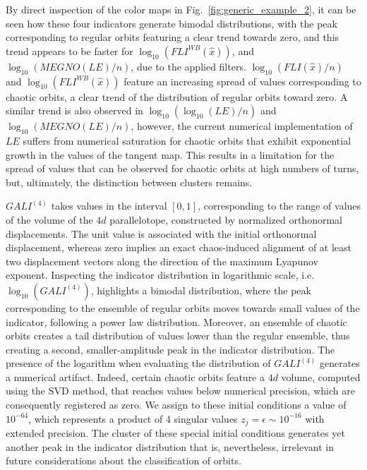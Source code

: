 \begin{chapterappendices}
By direct inspection of the color maps in Fig.~\ref{fig:generic_example_2}, it can be seen how these four indicators generate bimodal distributions, with the peak corresponding to regular orbits featuring a clear trend towards zero, and this trend appears to be faster for $\log_{10}(FLI^{WB}(\hat{x}))$, and $\log_{10}(MEGNO(LE)/n)$, due to the applied filters. $\log_{10}(FLI(\hat{x})/n)$ and $\log_{10}(FLI^{WB}(\hat{x}))$ feature an increasing spread of values corresponding to chaotic orbits, a clear trend of the distribution of regular orbits toward zero. A similar trend is also observed in $\log_{10}(\log_{10}(LE)/n)$ and $\log_{10}(MEGNO(LE)/n)$, however, the current numerical implementation of $LE$ suffers from numerical saturation for chaotic orbits that exhibit exponential growth in the values of the tangent map. This results in a limitation for the spread of values that can be observed for chaotic orbits at high numbers of turns, but, ultimately, the distinction between clusters remains. 

$GALI^{(4)}$ takes values in the interval $[0,1]$, corresponding to the range of values of the volume of the $4d$ parallelotope, constructed by normalized orthonormal displacements. The unit value is associated with the initial orthonormal displacement, whereas zero implies an exact chaos-induced alignment of at least two displacement vectors along the direction of the maximum Lyapunov exponent. Inspecting the indicator distribution in logarithmic scale, i.e.~$\log_{10}(GALI^{(4)})$, highlights a bimodal distribution, where the peak corresponding to the ensemble of regular orbits moves towards small values of the indicator, following a power law distribution. Moreover, an ensemble of chaotic orbits creates a tail distribution of values lower than the regular ensemble, thus creating a second, smaller-amplitude peak in the indicator distribution. The presence of the logarithm when evaluating the distribution of $GALI^{(4)}$ generates a numerical artifact. Indeed, certain chaotic orbits feature a $4d$ volume, computed using the SVD method, that reaches values below numerical precision, which are consequently registered as zero. We assign to these initial conditions a value of $10^{-64}$, which represents a product of 4 singular values $z_j=\epsilon\sim10^{-16}$ with extended precision. The cluster of these special initial conditions generates yet another peak in the indicator distribution that is, nevertheless, irrelevant in future considerations about the classification of orbits. 


\end{chapterappendices}
